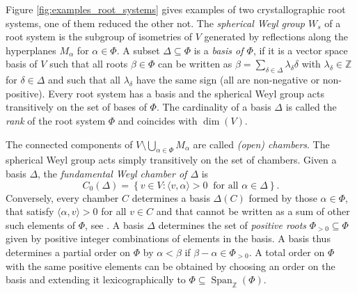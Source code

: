 \documentclass[12pt]{amsart}
\newcommand{\Z}{\mathbb{Z} }
\numberwithin{equation}{section}
\newtheorem{lemma}[theorem]{Lemma}
\theoremstyle{remark} %
\begin{document}
	Figure \ref{fig:examples_root_systems} gives examples of two crystallographic root systems, one of them reduced the other not.	The \emph{spherical Weyl group $W_s$} of a root system is the subgroup of isometries of $V$ generated by reflections along the hyperplanes $M_\alpha$ for $\alpha \in \Phi$. A subset $\Delta \subseteq \Phi$ is a \emph{basis of $\Phi$}, if it is a vector space basis of $V$ such that all roots $\beta \in \Phi$ can be written as $\beta = \sum_{\delta \in \Delta} \lambda_\delta \delta$ with $\lambda_\delta \in \Z$ for $\delta \in \Delta$ and such that all $\lambda_{\delta}$ have the same sign (all are non-negative or non-positive). Every root system has a basis and the spherical Weyl group acts transitively on the set of bases of $\Phi$. The cardinality of a basis $\Delta$ is called the \emph{rank} of the root system $\Phi$ and coincides with $\dim(V)$.
	 
	The connected components of $V\setminus \bigcup_{\alpha \in \Phi} M_\alpha$ are called \emph{(open) chambers}. The spherical Weyl group acts simply transitively on the set of chambers. Given a basis $\Delta$, the \emph{fundamental Weyl chamber of $\Delta$} is
	$$
	C_0(\Delta) = \left\{ v\in V \colon \langle v, \alpha \rangle >0 \ \text{ for all } \alpha \in \Delta \right\}.
	$$ %
	Conversely, every chamber $C$ determines a basis $\Delta(C)$ formed by those $\alpha \in \Phi$, that satisfy $\langle \alpha, v \rangle >0$ for all $v \in C$ and that cannot be written as a sum of other such elements of $\Phi$, see \cite[VI\S1.5]{Bou08}. A basis $\Delta$ determines the set  of \emph{positive roots} $\Phi_{>0} \subseteq \Phi$ given by positive integer combinations of elements in the basis. A basis thus determines a partial order on $\Phi$ by $\alpha < \beta$ if $\beta-\alpha \in \Phi_{>0}$.  A total order on $\Phi$ with the same positive elements can be obtained by choosing an order on the basis and extending it lexicographically to $ \Phi \subseteq \operatorname{Span}_{\mathbb{Z}}(\Phi)$.
	

	
	
\end{document}
